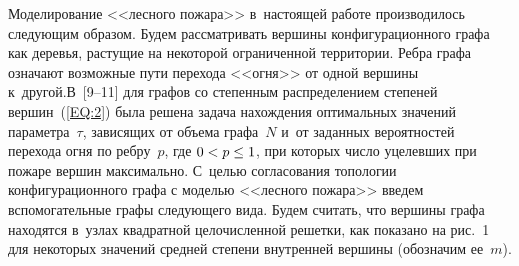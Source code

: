 \begin{multicols}{2}
\vspace*{-1pt}

Моделирование <<лесного пожара>> в~настоящей работе производилось следующим
образом. Будем рассматривать вершины конфигурационного графа как деревья, растущие
на некоторой ограниченной территории. Ребра графа означают возможные пути перехода
<<огня>> от одной вершины к~другой.\linebreak В~[9--11] для графов со степенным
распределением степеней вершин~(\ref{EQ:2}) была решена задача нахождения оптимальных
значений параметра~$\tau$, зависящих от объема графа~$N$ и~от заданных вероятностей
перехода огня по реб\-ру~$p$, где $0\hm<p\hm\leq 1$, при которых чис\-ло уцелевших при пожаре
вершин максимально.
С~целью согласования топологии кон\-фи\-гу\-ра\-ционного графа с моделью <<лесного пожара>>
введем вспомогательные графы следующего вида. Будем считать, что вершины графа находятся
в~узлах квад\-рат\-ной це\-ло\-чис\-лен\-ной решетки, как показано на рис.~1 для
некоторых значений средней степени внутренней вершины (обозначим ее~$m$).

\begin{figure*} %
 \vspace*{1pt}
 \begin{minipage}[t]{79mm}
 \begin{center}
 \mbox{%
 \epsfxsize=77.828mm
 }
\end{center}
 \vspace*{-9pt}
\end{minipage}
\hfill
 \vspace*{1pt}
  \begin{minipage}[t]{80mm}
 \begin{center}
 \mbox{%
 \epsfxsize=78.612mm
 }
\end{center}
 \vspace*{-9pt}
\end{minipage}
\end{figure*}


\end{multicols}
